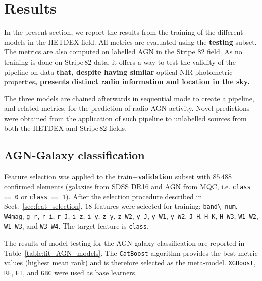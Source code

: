 \documentclass{aa}
\begin{document}

\section{Results}\label{sec:results}
In the present section, we report the results from the training of the different models in the HETDEX field. All metrics are evaluated using the \textbf{testing} subset. The metrics are also computed on labelled AGN in the Stripe 82 field. As no training is done on Stripe\,82 data, it offers a way to test the validity of the pipeline on data \textbf{that, despite having similar} optical-NIR photometric properties\textbf{, presents distinct radio information and location in the sky.}

The three models are chained afterwards in sequential mode to create a pipeline, and related metrics, for the prediction of radio-AGN activity. Novel predictions were obtained from the application of such pipeline to unlabelled sources from both the HETDEX and Stripe\,82 fields. 

\subsection{AGN-Galaxy classification}\label{sec:results_agn}
Feature selection was applied to the train+\textbf{validation} subset with $85\,488$ confirmed elements (galaxies from SDSS DR16 and AGN from MQC, i.e. \texttt{class == 0} or \texttt{class == 1}). After the selection procedure described in Sect.~\ref{sec:feat_selection}, $18$ features were selected for training: \verb|band\_num|, \verb|W4mag|, \verb|g_r|\textbf{,} \verb|r_i|, \verb|r_J|, \verb|i_z|, \verb|i_y|, \verb|z_y|, \verb|z_W2|, \verb|y_J|, \verb|y_W1|, \verb|y_W2|, \verb|J_H|, \verb|H_K|, \verb|H_W3|, \verb|W1_W2|, \verb|W1_W3|, and \verb|W3_W4|. The target feature is \verb|class|.

The results of model testing for the AGN-galaxy classification are reported in Table~\ref{table:fit_AGN_models}. The \verb|CatBoost| algorithm provides the best metric values (highest mean rank) and is therefore selected as the  meta-model. \verb|XGBoost|, \verb|RF|, \verb|ET|, and \verb|GBC| were used as base learners.
\end{document}
